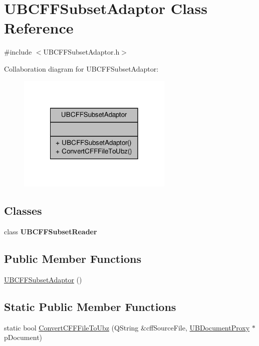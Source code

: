 \hypertarget{class_u_b_c_f_f_subset_adaptor}{\section{U\-B\-C\-F\-F\-Subset\-Adaptor Class Reference}
\label{dc/dd6/class_u_b_c_f_f_subset_adaptor}
}


{\ttfamily \#include $<$U\-B\-C\-F\-F\-Subset\-Adaptor.\-h$>$}



Collaboration diagram for U\-B\-C\-F\-F\-Subset\-Adaptor\-:
\nopagebreak
\begin{figure}[H]
\begin{center}
\leavevmode
\includegraphics[width=210pt]{d9/d85/class_u_b_c_f_f_subset_adaptor__coll__graph}
\end{center}
\end{figure}
\subsection*{Classes}
\begin{DoxyCompactItemize}
\item 
class {\bfseries U\-B\-C\-F\-F\-Subset\-Reader}
\end{DoxyCompactItemize}
\subsection*{Public Member Functions}
\begin{DoxyCompactItemize}
\item 
\hyperlink{class_u_b_c_f_f_subset_adaptor_ab68d483e0198dcb91eaa269d8c20de29}{U\-B\-C\-F\-F\-Subset\-Adaptor} ()
\end{DoxyCompactItemize}
\subsection*{Static Public Member Functions}
\begin{DoxyCompactItemize}
\item 
static bool \hyperlink{class_u_b_c_f_f_subset_adaptor_a013e959cc82465a0bd5276434cd7d5ab}{Convert\-C\-F\-F\-File\-To\-Ubz} (Q\-String \&cff\-Source\-File, \hyperlink{class_u_b_document_proxy}{U\-B\-Document\-Proxy} $\ast$p\-Document)
\end{DoxyCompactItemize}


